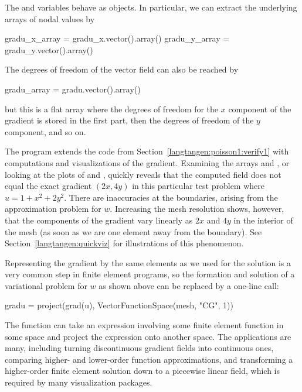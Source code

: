 The  and
 variables behave as
 objects. In particular, we
can extract the underlying arrays of nodal values by 
\begin{python}
gradu_x_array = gradu_x.vector().array()
gradu_y_array = gradu_y.vector().array()
\end{python}
The degrees of freedom of the  vector field can also be
reached by
\begin{python}
gradu_array = gradu.vector().array()
\end{python}
but this is a flat  array where
the degrees of freedom for the $x$ component of the gradient is stored
in the first part, then the degrees of freedom of the $y$ component,
and so on.

The program  extends the
code  from
Section~\ref{langtangen:poisson1:verify1} with computations and
visualizations of the gradient.  Examining the arrays
  and
, or looking at the plots
of  and
, quickly reveals that the
computed  field does not equal
the exact gradient $(2x, 4y)$ in this particular test problem where
$u=1+x^2+2y^2$.  There are inaccuracies at the boundaries, arising
from the approximation problem for $w$. Increasing the mesh resolution
shows, however, that the components of the gradient vary linearly as
$2x$ and $4y$ in the interior of the mesh (as soon as we are one
element away from the boundary). See Section~\ref{langtangen:quickviz}
for illustrations of this phenomenon.

Representing the gradient by the same elements as we used for the
solution is a very common step in finite element programs, so the
formation and solution of a variational problem for $w$ as shown above
can be replaced by a one-line
call:
\begin{python}
gradu = project(grad(u), VectorFunctionSpace(mesh, "CG", 1))
\end{python}
The  function can take an
expression involving some finite element function in some space and
project the expression onto another space.  The applications are many,
including turning discontinuous gradient fields into continuous ones,
comparing higher- and lower-order function approximations, and
transforming a higher-order finite element solution down to a
piecewise linear field, which is required by many visualization
packages.

